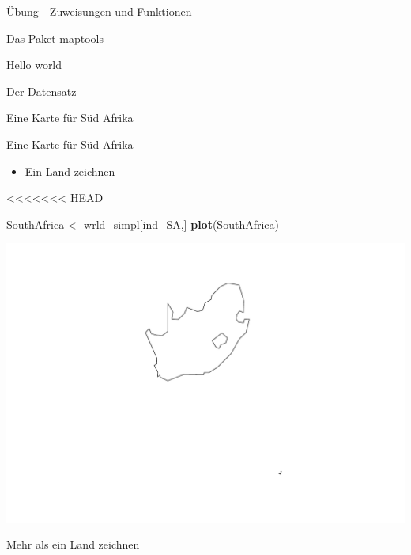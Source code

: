 \documentclass[ignorenonframetext,]{beamer}
\newenvironment{Shaded}{\begin{snugshade}}{\end{snugshade}}
\newcommand{\DataTypeTok}[1]{\textcolor[rgb]{0.74,0.68,0.62}{\underline{#1}}}
\newcommand{\DecValTok}[1]{\textcolor[rgb]{0.27,0.67,0.26}{#1}}
\newcommand{\KeywordTok}[1]{\textcolor[rgb]{0.26,0.66,0.93}{\textbf{#1}}}
\newcommand{\NormalTok}[1]{\textcolor[rgb]{0.74,0.68,0.62}{#1}}
\newcommand{\OperatorTok}[1]{\textcolor[rgb]{0.74,0.68,0.62}{#1}}
\newcommand{\StringTok}[1]{\textcolor[rgb]{0.02,0.61,0.04}{#1}}
\providecommand{\tightlist}{%
  \setlength{\itemsep}{0pt}\setlength{\parskip}{0pt}}
\begin{document}
\begin{frame}[fragile]{Übung - Zuweisungen und Funktionen}
\begin{frame}[fragile]{Das Paket maptools}
\begin{frame}[fragile]{Hello world}
\begin{frame}[fragile]{Der Datensatz}
\begin{frame}[fragile]{Eine Karte für Süd Afrika}
\begin{frame}{Eine Karte für Süd Afrika}
\begin{itemize}
\tightlist
\item
  Ein Land zeichnen
\end{itemize}

<<<<<<< HEAD
\begin{Shaded}
\begin{Highlighting}[]
\NormalTok{SouthAfrica <-}\StringTok{ }\NormalTok{wrld_simpl[ind_SA,]}
\KeywordTok{plot}\NormalTok{(SouthAfrica)}
\end{Highlighting}
\end{Shaded}

\includegraphics{Geomedizin_files/figure-beamer/unnamed-chunk-71-1.pdf}

\end{frame}

\begin{frame}[fragile]{Mehr als ein Land zeichnen}
\protect\hypertarget{mehr-als-ein-land-zeichnen}{}

\begin{Shaded}
\end{Shaded}


\end{frame}
\end{frame}
\end{frame}
\end{frame}
\end{frame}
\end{frame}
\end{document}
